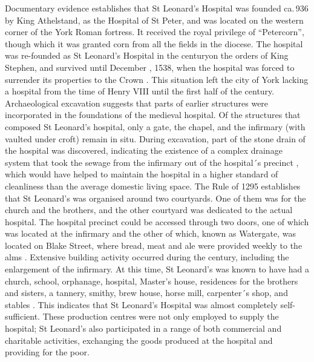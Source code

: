 \documentclass[%
	]{ijsra}
\begin{document}
Documentary evidence establishes that St Leonard’s Hospital was founded ca.\,936 by King Athelstand, as the Hospital of St Peter, and was located on the western corner of the York Roman fortress. It received the royal privilege of “Petercorn”, though which it was granted corn from all the fields in the diocese. The hospital was re-founded as St Leonard’s Hospital in the  century\AD on the orders of King Stephen, and survived until December , 1538, when the hospital was forced to surrender its properties to the Crown 
\parencite[288]{Palliser_2014}. This situation left the city of York lacking a hospital from the time of Henry VIII until the first half of the  century\AD \parencite{YorkMuseumGardens_2016}.
Archaeological excavation suggests that parts of earlier structures were incorporated in the foundations of the medieval hospital. Of the structures that composed St Leonard’s hospital, only a gate, the chapel, and the infirmary (with vaulted under croft) remain in situ. During excavation, part of the stone drain of the hospital was discovered, indicating the existence of a complex drainage system that took the sewage from the infirmary out of the hospital´s precinct \parencite{Johnson_2014}, which would have helped to maintain the hospital in a higher standard of cleanliness than the average domestic living space.
The Rule of 1295 establishes that St Leonard’s was organised around two courtyards. One of them was for the church and the brothers, and the other courtyard was dedicated to the actual hospital. The hospital precinct could be accessed through two doors, one of which was located at the infirmary and the other of which, known as Watergate, was located on Blake Street, where bread, meat and ale were provided weekly to the alms \parencites[8-9,28-29]{Cullum_1991}[17]{Cullum_1999}{Johnson_2014}[151]{Palliser_2014}[116]{Raine_1955}[314]{Rawcliffe_2004}.
Extensive building activity occurred during the  century\AD, including the enlargement of the infirmary. At this time, St Leonard’s was known to have had a church, school, orphanage, hospital, Master’s house, residences for the brothers and sisters, a tannery, smithy, brew house, horse mill, carpenter´s shop, and stables 
\parencites[99]{Dean_2008}[116]{Raine_1955}. This indicates that St Leonard’s Hospital was almost completely self-sufficient. These production centres were not only employed to supply the hospital; St Leonard’s also participated in a range of both commercial and charitable activities, exchanging the goods produced at the hospital and providing for the poor.
\end{document}
